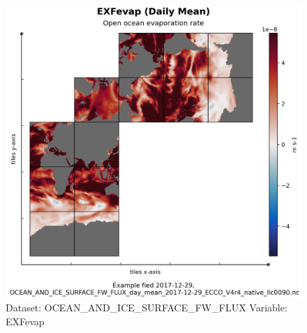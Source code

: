 \begin{figure}[H]
\centering
\includegraphics[width=\textwidth]{../images/plots/native_plots/Ocean_and_Sea-Ice_Surface_Freshwater_Fluxes/EXFevap.png}
\caption{Dataset: OCEAN\_AND\_ICE\_SURFACE\_FW\_FLUX Variable: EXFevap}
\label{tab:table-OCEAN_AND_ICE_SURFACE_FW_FLUX_EXFevap-Plot}
\end{figure}
\pagebreak
